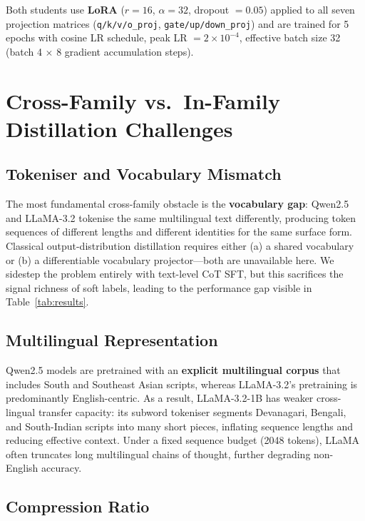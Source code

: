 \documentclass[11pt,a4paper]{article}
\begin{document}
Both students use \textbf{LoRA} ($r=16$, $\alpha=32$, dropout $=0.05$) applied to all
seven projection matrices (\texttt{q/k/v/o\_proj}, \texttt{gate/up/down\_proj}) and are
trained for 5 epochs with cosine LR schedule, peak LR $=2\times 10^{-4}$, effective batch
size 32 (batch 4 $\times$ 8 gradient accumulation steps).

\section{Cross-Family vs.\ In-Family Distillation Challenges}

\subsection{Tokeniser and Vocabulary Mismatch}

The most fundamental cross-family obstacle is the \textbf{vocabulary gap}: Qwen2.5 and
LLaMA-3.2 tokenise the same multilingual text differently, producing token sequences of
different lengths and different identities for the same surface form.  Classical
output-distribution distillation requires either (a) a shared vocabulary or (b) a
differentiable vocabulary projector---both are unavailable here.  We sidestep the
problem entirely with text-level CoT SFT, but this sacrifices the signal richness of
soft labels, leading to the performance gap visible in Table~\ref{tab:results}.

\subsection{Multilingual Representation}

Qwen2.5 models are pretrained with an \textbf{explicit multilingual corpus} that includes
South and Southeast Asian scripts, whereas LLaMA-3.2's pretraining is predominantly
English-centric.  As a result, LLaMA-3.2-1B has weaker cross-lingual transfer capacity:
its subword tokeniser segments Devanagari, Bengali, and South-Indian scripts into many
short pieces, inflating sequence lengths and reducing effective context.  Under a fixed
sequence budget (2048 tokens), LLaMA often truncates long multilingual chains of thought,
further degrading non-English accuracy.

\subsection{Compression Ratio}
\end{document}
